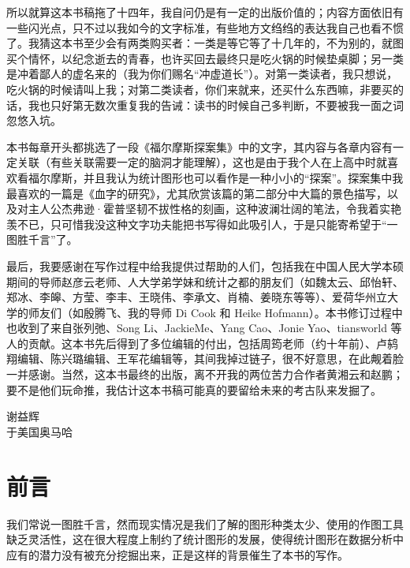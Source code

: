 \documentclass[
  b5paper,
  UTF8,twoside]{book}
\begin{document}
所以就算这本书稿拖了十四年，我自问仍是有一定的出版价值的；内容方面依旧有一些闪光点，只不过以我如今的文字标准，有些地方文绉绉的表达我自己也看不惯了。我猜这本书至少会有两类购买者：一类是等它等了十几年的，不为别的，就图买个情怀，以纪念逝去的青春，也许买回去最终只是吃火锅的时候垫桌脚；另一类是冲着鄙人的虚名来的（我为你们赐名``冲虚道长''）。对第一类读者，我只想说，吃火锅的时候请叫上我；对第二类读者，你们来就来，还买什么东西嘛，非要买的话，我也只好第无数次重复我的告诫：读书的时候自己多判断，不要被我一面之词忽悠入坑。

本书每章开头都挑选了一段《福尔摩斯探案集》中的文字，其内容与各章内容有一定关联（有些关联需要一定的脑洞才能理解），这也是由于我个人在上高中时就喜欢看福尔摩斯，并且我认为统计图形也可以看作是一种小小的``探案''。探案集中我最喜欢的一篇是《血字的研究》，尤其欣赏该篇的第二部分中大篇的景色描写，以及对主人公杰弗逊·霍普坚韧不拔性格的刻画，这种波澜壮阔的笔法，令我着实艳羡不已，只可惜我没这种文字功夫能把书写得如此吸引人，于是只能寄希望于``一图胜千言''了。

最后，我要感谢在写作过程中给我提供过帮助的人们，包括我在中国人民大学本硕期间的导师赵彦云老师、人大学弟学妹和统计之都的朋友们（如魏太云、邱怡轩、郑冰、李皞、方莹、李丰、王晓伟、李承文、肖楠、姜晓东等等）、爱荷华州立大学的师友们（如殷腾飞、我的导师 Di Cook 和 Heike Hofmann）。本书修订过程中也收到了来自张列弛、Song Li、JackieMe、Yang Cao、Jonie Yao、tiansworld 等人的贡献。这本书先后得到了多位编辑的付出，包括周筠老师（约十年前）、卢鸫翔编辑、陈兴璐编辑、王军花编辑等，其间我掉过链子，很不好意思，在此觍着脸一并感谢。当然，这本书最终的出版，离不开我的两位苦力合作者黄湘云和赵鹏；要不是他们玩命推，我估计这本书稿可能真的要留给未来的考古队来发掘了。

\begin{flushright}
谢益辉\\
于美国奥马哈
\end{flushright}

\mainmatter

\chapter*{前言}\label{forword}

我们常说一图胜千言，然而现实情况是我们了解的图形种类太少、使用的作图工具缺乏灵活性，这在很大程度上制约了统计图形的发展，使得统计图形在数据分析中应有的潜力没有被充分挖掘出来，正是这样的背景催生了本书的写作。
\end{document}
